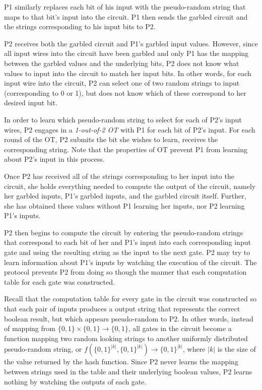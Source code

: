 \ac{P1} similarly replaces each bit of his input with the pseudo-random string that maps to that bit's input into the circuit. \ac{P1} then sends the garbled circuit and the strings corresponding to his input bits to \ac{P2}.

\ac{P2} receives both the garbled circuit and \ac{P1}'s garbled input values. However, since all input wires into the circuit have been garbled and only \ac{P1} has the mapping between the garbled values and the underlying bits, \ac{P2} does not know what values to input into the circuit to match her input bits.
In other words, for each input wire into the circuit, \ac{P2} can select one of two random strings to input (corresponding to 0 or 1), but does not know which of these correspond to her desired input bit.

In order to learn which pseudo-random string to select for each of \ac{P2}'s input wires, \ac{P2} engages in a \emph{1-out-of-2 \ac{OT}} with \ac{P1} for each bit of \ac{P2}'s input. For each round of the \ac{OT}, \ac{P2} submits the bit she wishes to learn, receives the corresponding string.  Note that the properties of \ac{OT} prevent \ac{P1} from learning about \ac{P2}'s input in this process.

Once \ac{P2} has received all of the strings corresponding to her input into the circuit, she holds everything needed to compute the output of the circuit, namely her garbled inputs, \ac{P1}'s garbled inputs, and the garbled circuit itself. Further, she has obtained these values without \ac{P1} learning her inputs, nor \ac{P2} learning \ac{P1}'s inputs.

\ac{P2} then begins to compute the circuit by entering the pseudo-random strings that correspond to each bit of her and \ac{P1}'s input into each corresponding input gate and using the resulting string as the input to the next gate. \ac{P2} may try to learn information about \ac{P1}'s inputs by watching the execution of the circuit. The protocol prevents \ac{P2} from doing so though the manner that each computation table for each gate was constructed.

Recall that the computation table for every gate in the circuit was constructed so that each pair of inputs produces a output string that represents the correct boolean result, but which appears pseudo-random to \ac{P2}.  In other words, instead of mapping from $\{0, 1\} \times \{0, 1\} \to \{0, 1\}$, all gates in the circuit become a function mapping two random looking strings to another uniformly distributed pseudo-random string, or $f(\{0, 1\}^{|k|}, \{0, 1\}^{|k|}) \to \{0, 1\}^{|k|}$, where $|k|$ is the size of the value returned by the hash function. Since \ac{P2} never learns the mapping between strings used in the table and their underlying boolean values, \ac{P2} learns nothing by watching the outputs of each gate.

